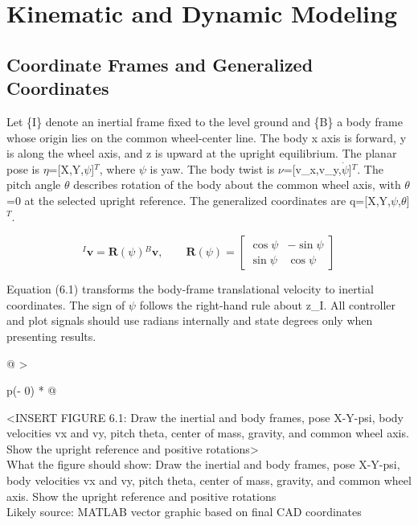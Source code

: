 \chapter{Kinematic and Dynamic Modeling}\label{ch:kinematic-and-dynamic-modeling}

\section{Coordinate Frames and Generalized Coordinates}\label{coordinate-frames-and-generalized-coordinates}

Let \{I\} denote an inertial frame fixed to the level ground and \{B\} a
body frame whose origin lies on the common wheel-center line. The body x
axis is forward, y is along the wheel axis, and z is upward at the
upright equilibrium. The planar pose is \ensuremath{\eta}=[X,Y,\ensuremath{\psi}]\ensuremath{^{T}}, where \ensuremath{\psi} is yaw.
The body twist is \ensuremath{\nu}=[v\_x,v\_y,\ensuremath{\dot{\psi}}]\ensuremath{^{T}}. The pitch angle \ensuremath{\theta} describes
rotation of the body about the common wheel axis, with \ensuremath{\theta}=0 at the
selected upright reference. The generalized coordinates are
q=[X,Y,\ensuremath{\psi},\ensuremath{\theta}]\ensuremath{^{T}}.

\begin{equation}
{}^{I}\mathbf{v}=\mathbf{R}(\psi){}^{B}\mathbf{v},\qquad
\mathbf{R}(\psi)=\begin{bmatrix}\cos\psi&-\sin\psi\\\sin\psi&\cos\psi\end{bmatrix}
\label{eq:6-1}
\end{equation}

Equation (6.1) transforms the body-frame translational velocity to
inertial coordinates. The sign of \ensuremath{\psi} follows the right-hand rule about
z\_I. All controller and plot signals should use radians internally and
state degrees only when presenting results.

\begin{longtable}[]{@{}
  >{\raggedright\arraybackslash}p{(\columnwidth - 0\tabcolsep) * }@{}}
\toprule\noalign{}
\begin{minipage}[b]{\linewidth}\raggedright
\textless INSERT FIGURE 6.1: Draw the inertial and body frames, pose
X-Y-psi, body velocities vx and vy, pitch theta, center of mass,
gravity, and common wheel axis. Show the upright reference and positive
rotations\textgreater{}\\
What the figure should show: Draw the inertial and body frames, pose
X-Y-psi, body velocities vx and vy, pitch theta, center of mass,
gravity, and common wheel axis. Show the upright reference and positive
rotations\\
Likely source: MATLAB vector graphic based on final CAD
coordinates\strut
\end{minipage} \\
\midrule\noalign{}
\endhead
\bottomrule\noalign{}
\endlastfoot
\end{longtable}

